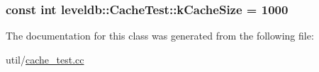 \hypertarget{classleveldb_1_1_cache_test_a101eeca736aed0fde7048d0bf21b7e0a}{
\subsubsection[{k\-Cache\-Size}]{\setlength{\rightskip}{0pt plus 5cm}const int leveldb\-::\-Cache\-Test\-::k\-Cache\-Size = 1000\hspace{0.3cm}{\ttfamily [static]}}}\label{classleveldb_1_1_cache_test_a101eeca736aed0fde7048d0bf21b7e0a}


The documentation for this class was generated from the following file\-:\begin{DoxyCompactItemize}
\item 
util/\hyperlink{cache__test_8cc}{cache\-\_\-test.\-cc}\end{DoxyCompactItemize}
